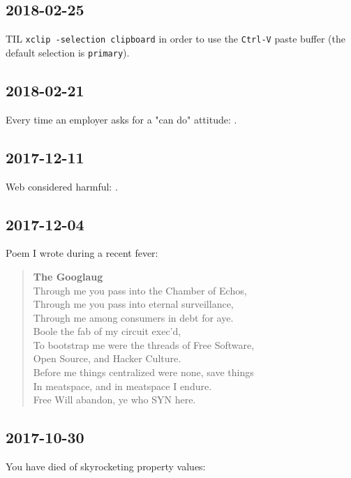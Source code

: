 \documentclass{article}
\begin{document}
\subsection{2018-02-25}
TIL \texttt{xclip -selection clipboard} in order to use the \texttt{Ctrl-V} paste buffer (the default selection is \texttt{primary}).

\subsection{2018-02-21}
Every time an employer asks for a "can do" attitude: .

\subsection{2017-12-11}
Web considered harmful: .

\subsection{2017-12-04}
Poem I wrote during a recent fever:
\begin{center}
\begin{verse}
{\large\textbf{The Googlaug}} \\
Through me you pass into the Chamber of Echos, \\
Through me you pass into eternal surveillance, \\
Through me among consumers in debt for aye. \\
Boole the fab of my circuit exec'd, \\
To bootstrap me were the threads of Free Software, \\
Open Source, and Hacker Culture. \\
Before me things centralized were none, save things \\
In meatspace, and in meatspace I endure. \\
Free Will abandon, ye who SYN here.
\end{verse}
\end{center}

\subsection{2017-10-30}
You have died of skyrocketing property values: 
\end{document}
